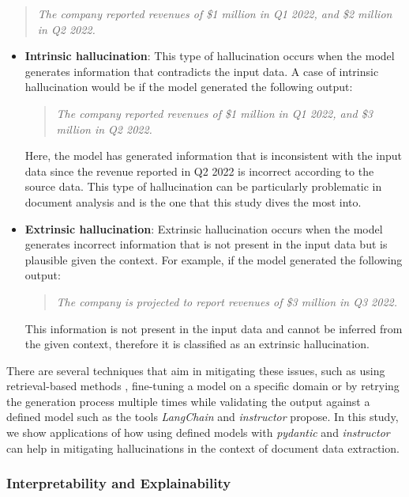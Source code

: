 \documentclass[english, 12pt, a4paper, elec, utf8, a-2b, online]{aaltothesis}
\begin{document}
\begin{quote}
    \textit{The company reported revenues of \$1 million in Q1 2022, and \$2 million in Q2 2022.}
\end{quote}

\begin{itemize}
    \label{list:hallucinations:1}
    \item \textbf{Intrinsic hallucination}: This type of hallucination occurs when the model generates information that contradicts the input data.
    A case of intrinsic hallucination would be if the model generated the following output:
    \begin{quote}
        \textit{The company reported revenues of \$1 million in Q1 2022, and \$3 million in Q2 2022.}
    \end{quote}
    Here, the model has generated information that is inconsistent with the input data since the revenue reported in Q2 2022 is incorrect according to the source data.
    This type of hallucination can be particularly problematic in document analysis and is the one that this study dives the most into.
    \item \textbf{Extrinsic hallucination}: Extrinsic hallucination occurs when the model generates incorrect information that is not present in the input data but is plausible given the context.
    For example, if the model generated the following output:
    \begin{quote}
        \textit{The company is projected to report revenues of \$3 million in Q3 2022.}
    \end{quote}
    This information is not present in the input data and cannot be inferred from the given context, therefore it is classified as an extrinsic hallucination.
\end{itemize}

There are several techniques that aim in mitigating these issues, such as using retrieval-based methods \cite{lewis2020retrievalaugmented}, fine-tuning a model on a specific domain \cite{Brown2020} or by retrying the generation process multiple times while validating the output against a defined model such as the tools \textit{LangChain} \cite{Chase_LangChain_2022} and \textit{instructor} \cite{Instructor2023} propose.
In this study, we show applications of how using defined models with \textit{pydantic} \cite{pydantic} and \textit{instructor} can help in mitigating hallucinations in the context of document data extraction.

\subsubsection{Interpretability and Explainability}
\end{document}

